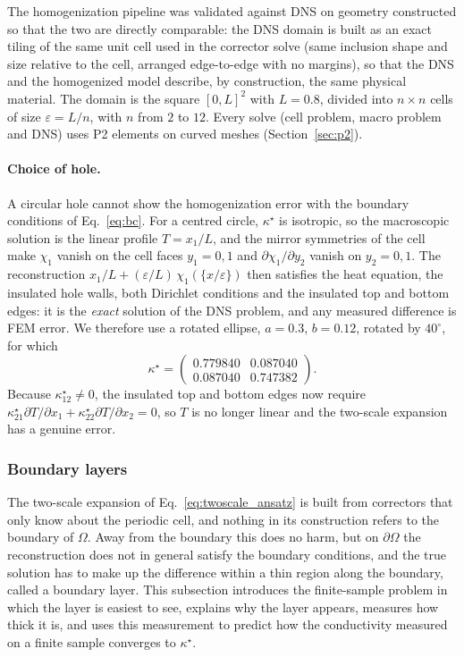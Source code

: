 \documentclass{article}
\makeatletter
\providecommand\FloatBarrier{\par\begingroup\let\@elt\relax
  \edef\@tempa{\@botlist\@deferlist\@dbldeferlist}%
  \ifx\@tempa\@empty\else\clearpage\fi\endgroup}
\makeatother
\begin{document}
The homogenization pipeline was validated against DNS on geometry
constructed so that the two are directly comparable: the DNS domain is built
as an exact tiling of the same unit cell used in the corrector solve (same
inclusion shape and size relative to the cell, arranged edge-to-edge with no
margins), so that the DNS and the homogenized model describe, by
construction, the same physical material. The domain is the square
$[0, L]^2$ with $L = 0.8$, divided into $n \times n$ cells of size
$\varepsilon = L / n$, with $n$ from $2$ to $12$. Every solve (cell problem, macro
problem and DNS) uses P2 elements on curved meshes (Section~\ref{sec:p2}).

\paragraph{Choice of hole.} A circular hole cannot show the homogenization
error with the boundary conditions of Eq.~\eqref{eq:bc}. For a centred circle,
$\kappa^{\star}$ is isotropic, so the macroscopic solution is the linear profile
$T = x_1 / L$, and the mirror symmetries of the cell make $\chi_1$ vanish on the cell
faces $y_1 = 0, 1$ and $\partial \chi_1 / \partial y_2$ vanish on $y_2 = 0, 1$. The reconstruction
$x_1/L + (\varepsilon / L)\, \chi_1(\{x/\varepsilon\})$ then satisfies the heat
equation, the insulated hole walls, both Dirichlet conditions and the insulated
top and bottom edges: it is the \emph{exact} solution of the DNS problem, and
any measured difference is FEM error. We therefore use a rotated ellipse,
$a = 0.3$, $b = 0.12$, rotated by $40^{\circ}$, for which
\[
\kappa^{\star} = \begin{pmatrix} 0.779840 & 0.087040 \\ 0.087040 & 0.747382 \end{pmatrix}.
\]
Because $\kappa^{\star}_{12} \neq 0$, the insulated top and bottom edges now
require $\kappa^{\star}_{21} \partial T / \partial x_1 + \kappa^{\star}_{22} \partial T / \partial x_2 = 0$, so $T$
is no longer linear and the two-scale expansion has a genuine error.

\FloatBarrier
\subsubsection{Boundary layers}
\label{sec:boundary_layer}

The two-scale expansion of Eq.~\eqref{eq:twoscale_ansatz} is built from correctors
that only know about the periodic cell, and nothing in its construction refers to the
boundary of $\Omega$. Away from the boundary this does no harm, but on $\partial\Omega$
the reconstruction does not in general satisfy the boundary conditions, and the true
solution has to make up the difference within a thin region along the boundary, called
a boundary layer. This subsection introduces the finite-sample problem in which the layer is easiest
to see, explains why the layer appears, measures how thick it is, and uses this
measurement to predict how the conductivity measured on a finite sample converges to
$\kappa^{\star}$.
\end{document}
